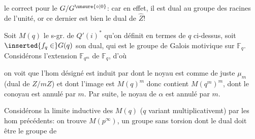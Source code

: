 
le  correct pour le $G/G^{\unsure{\circ|0}}$: car en effet, il est dual au groupe des racines de l'unité, or ce dernier est bien le dual de $\widehat Z$!


Soit $M(q)$ le s-gr. de $Q'(i)^*$ qu'on définit en termes de $q$ ci-dessus, soit  $\inserted{f_q\in}G(q)$ son dual, qui est le groupe de Galois motivique sur $\mathbb F_q$. Considérons l'extension $\mathbb F_{q^m}$ de $\mathbb F_q$, d'où


 on voit que l'hom désigné \unsure{$\alpha$} est induit par
dont le noyau est comme de juste  $\mu_m$ (dual de $Z/mZ$) et dont l'image est $M(q)^m$ donc contient $M(q^m)^m$, dont le conoyau est annulé par $m$. Par suite, le  noyau de $\alpha$ est annulé par $m$.

 Considérons la limite inductive des $M(q)$ ($q$ variant multiplicativemt) par les hom précédents: on trouve $M(p^\infty)$, un groupe sans torsion dont le dual doit être le groupe de

